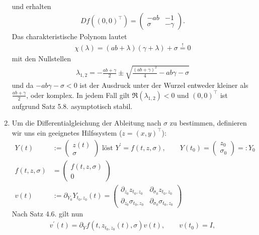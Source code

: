 \begin{solution}
\begin{enumerate}[label = \textbf{\alph*)}]
\begin{align*}
\end{align*}
und erhalten
\begin{align*}
  Df((0,0)^{\top}) =
  \begin{pmatrix}
    - ab & -1 \\
    \sigma & - \gamma
  \end{pmatrix}.
\end{align*}
Das charakteristische Polynom lautet
\begin{align*}
  \chi(\lambda) = (ab + \lambda)(\gamma + \lambda) + \sigma \stackrel{!}{=} 0
\end{align*}
mit den Nullstellen
\begin{align*}
  \lambda_{1,2} = -\frac{ab+\gamma}{2} \pm \sqrt{\frac{(ab + \gamma)^2}{4} -ab\gamma - \sigma}
\end{align*}
und da $-ab\gamma - \sigma < 0$ ist der Ausdruck unter der Wurzel entweder kleiner
als $\frac{ab+\gamma}{2}$, oder komplex. In jedem Fall gilt $\Re(\lambda_{1,2}) < 0$
und $(0,0)^{\top}$ ist aufgrund Satz 5.8. asymptotisch stabil.
\item Um die Differentialgleichung der Ableitung nach $\sigma$ zu bestimmen,
definieren wir uns ein geeignetes Hilfssystem ($z = (x,y)^{\top}$):
\begin{align*}
  Y(t) &:= \begin{pmatrix}
    z(t) \\ \sigma
  \end{pmatrix} \text{ löst }
  Y^{\prime} = f(t,z,\sigma), \qquad Y(t_0) =
  \begin{pmatrix}
    z_0 \\ \sigma_0
  \end{pmatrix} =: Y_0 \\
    f(t,z,\sigma) &= \begin{pmatrix}
      f(t,z,\sigma) \\ 0
  \end{pmatrix} \\
  v(t) &:= \partial_{Y_0} Y_{t_0,z_0}(t) =
  \begin{pmatrix}
    \partial_{z_0} z_{t_0,z_0} & \partial_{\sigma_0} z_{t_0,z_0} \\
    \partial_{z_0} \sigma_{t_0,z_0} & \partial_{\sigma_0} \sigma_{t_0,z_0}
  \end{pmatrix}
\end{align*}
Nach Satz 4.6. gilt nun
\begin{align*}
  v^{\prime}(t) = \partial_Y f(t,z_{t_0,z_0}(t), \sigma)v(t), \qquad v(t_0) = I,
\end{align*}

\end{enumerate}
\end{solution}
